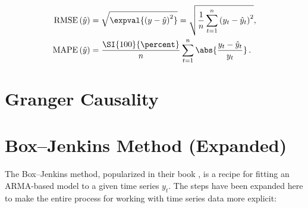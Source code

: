 \begin{subequations}\label{eq:time_series:RMSE_MAPE}
\begin{align}
\text{RMSE}\left(\hat{y}\right) &= \sqrt{\expval{\left(y - \hat{y}\right)^{2}}} = \sqrt{\frac{1}{n}\sum_{t=1}^{n} \left(y_{t} - \hat{y}_{t}\right)^{2}}, \label{eq:time_series:RMSE} \\
\text{MAPE}\left(\hat{y}\right) &= \frac{\SI{100}{\percent}}{n} \sum_{t=1}^{n} \abs{\frac{y_{t} - \hat{y}_{t}}{y_{t}}}\,. \label{eq:time_series:MAPE}
\end{align}
\end{subequations}

\section{Granger Causality}
\label{time_series:granger_causality}

\section{Box--Jenkins Method (Expanded)}
\label{time_series:box_jenkins}

The Box--Jenkins method, popularized in their book \cite{boxjen76},
is a recipe for fitting an ARMA-based model to a given time series $y_{t}$.
The steps have been expanded here to make the entire process
for working with time series data more explicit:

